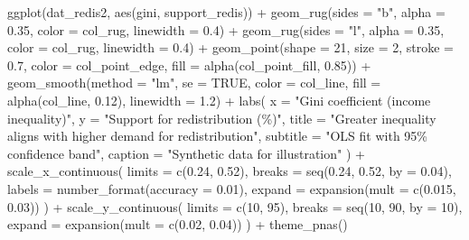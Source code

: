 \documentclass[
  letterpaper,
  DIV=11,
  numbers=noendperiod]{scrreprt}
\newenvironment{Shaded}{\begin{snugshade}}{\end{snugshade}}
\newcommand{\AttributeTok}[1]{\textcolor[rgb]{0.40,0.45,0.13}{#1}}
\newcommand{\ConstantTok}[1]{\textcolor[rgb]{0.56,0.35,0.01}{#1}}
\newcommand{\DecValTok}[1]{\textcolor[rgb]{0.68,0.00,0.00}{#1}}
\newcommand{\FloatTok}[1]{\textcolor[rgb]{0.68,0.00,0.00}{#1}}
\newcommand{\FunctionTok}[1]{\textcolor[rgb]{0.28,0.35,0.67}{#1}}
\newcommand{\NormalTok}[1]{\textcolor[rgb]{0.00,0.23,0.31}{#1}}
\newcommand{\SpecialCharTok}[1]{\textcolor[rgb]{0.37,0.37,0.37}{#1}}
\newcommand{\StringTok}[1]{\textcolor[rgb]{0.13,0.47,0.30}{#1}}
\begin{document}
\begin{Shaded}
\begin{Highlighting}[]
\FunctionTok{ggplot}\NormalTok{(dat\_redis2, }\FunctionTok{aes}\NormalTok{(gini, support\_redis)) }\SpecialCharTok{+}
  \FunctionTok{geom\_rug}\NormalTok{(}\AttributeTok{sides =} \StringTok{"b"}\NormalTok{, }\AttributeTok{alpha =} \FloatTok{0.35}\NormalTok{, }\AttributeTok{color =}\NormalTok{ col\_rug, }\AttributeTok{linewidth =} \FloatTok{0.4}\NormalTok{) }\SpecialCharTok{+}
  \FunctionTok{geom\_rug}\NormalTok{(}\AttributeTok{sides =} \StringTok{"l"}\NormalTok{, }\AttributeTok{alpha =} \FloatTok{0.35}\NormalTok{, }\AttributeTok{color =}\NormalTok{ col\_rug, }\AttributeTok{linewidth =} \FloatTok{0.4}\NormalTok{) }\SpecialCharTok{+}
  \FunctionTok{geom\_point}\NormalTok{(}\AttributeTok{shape =} \DecValTok{21}\NormalTok{, }\AttributeTok{size =} \DecValTok{2}\NormalTok{, }\AttributeTok{stroke =} \FloatTok{0.7}\NormalTok{,}
             \AttributeTok{color =}\NormalTok{ col\_point\_edge, }\AttributeTok{fill =} \FunctionTok{alpha}\NormalTok{(col\_point\_fill, }\FloatTok{0.85}\NormalTok{)) }\SpecialCharTok{+}
  \FunctionTok{geom\_smooth}\NormalTok{(}\AttributeTok{method =} \StringTok{"lm"}\NormalTok{, }\AttributeTok{se =} \ConstantTok{TRUE}\NormalTok{, }\AttributeTok{color =}\NormalTok{ col\_line,}
              \AttributeTok{fill =} \FunctionTok{alpha}\NormalTok{(col\_line, }\FloatTok{0.12}\NormalTok{), }\AttributeTok{linewidth =} \FloatTok{1.2}\NormalTok{) }\SpecialCharTok{+}
  \FunctionTok{labs}\NormalTok{(}
    \AttributeTok{x =} \StringTok{"Gini coefficient (income inequality)"}\NormalTok{,}
    \AttributeTok{y =} \StringTok{"Support for redistribution (\%)"}\NormalTok{,}
    \AttributeTok{title =} \StringTok{"Greater inequality aligns with higher demand for redistribution"}\NormalTok{,}
    \AttributeTok{subtitle =} \StringTok{"OLS fit with 95\% confidence band"}\NormalTok{,}
    \AttributeTok{caption =} \StringTok{"Synthetic data for illustration"}
\NormalTok{  ) }\SpecialCharTok{+}
  \FunctionTok{scale\_x\_continuous}\NormalTok{(}
    \AttributeTok{limits =} \FunctionTok{c}\NormalTok{(}\FloatTok{0.24}\NormalTok{, }\FloatTok{0.52}\NormalTok{),}
    \AttributeTok{breaks =} \FunctionTok{seq}\NormalTok{(}\FloatTok{0.24}\NormalTok{, }\FloatTok{0.52}\NormalTok{, }\AttributeTok{by =} \FloatTok{0.04}\NormalTok{),}
    \AttributeTok{labels =} \FunctionTok{number\_format}\NormalTok{(}\AttributeTok{accuracy =} \FloatTok{0.01}\NormalTok{),}
    \AttributeTok{expand =} \FunctionTok{expansion}\NormalTok{(}\AttributeTok{mult =} \FunctionTok{c}\NormalTok{(}\FloatTok{0.015}\NormalTok{, }\FloatTok{0.03}\NormalTok{))}
\NormalTok{  ) }\SpecialCharTok{+}
  \FunctionTok{scale\_y\_continuous}\NormalTok{(}
    \AttributeTok{limits =} \FunctionTok{c}\NormalTok{(}\DecValTok{10}\NormalTok{, }\DecValTok{95}\NormalTok{),}
    \AttributeTok{breaks =} \FunctionTok{seq}\NormalTok{(}\DecValTok{10}\NormalTok{, }\DecValTok{90}\NormalTok{, }\AttributeTok{by =} \DecValTok{10}\NormalTok{),}
    \AttributeTok{expand =} \FunctionTok{expansion}\NormalTok{(}\AttributeTok{mult =} \FunctionTok{c}\NormalTok{(}\FloatTok{0.02}\NormalTok{, }\FloatTok{0.04}\NormalTok{))}
\NormalTok{  ) }\SpecialCharTok{+}
  \FunctionTok{theme\_pnas}\NormalTok{()}
\end{Highlighting}
\end{Shaded}
\end{document}
